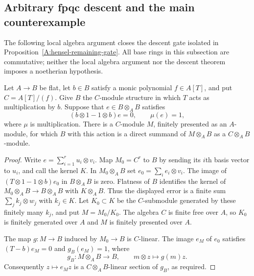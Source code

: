 \subsection{Arbitrary fpqc descent and the main counterexample}

The following local algebra argument closes the descent gate isolated
in Proposition~\ref{A:hensel-remaining-gate}.  All base rings in this
subsection are commutative; neither the local algebra argument nor the
descent theorem imposes a noetherian hypothesis.

\begin{lemma}
\label{A:fpqc-finite-module}
Let $A\to B$ be flat, let $b\in B$ satisfy a monic polynomial
$f\in A[T]$, and put $C=A[T]/(f)$.  Give $B$ the $C$-module
structure in which $T$ acts as multiplication by $b$.  Suppose that
$e\in B\otimes_A B$ satisfies
\[
 (b\otimes1-1\otimes b)e=0,\qquad \mu(e)=1,
\]
where $\mu$ is multiplication.  There is a $C$-module $M$, finitely
presented as an $A$-module, for which $B$ with this action is a direct
summand of $M\otimes_A B$ as a $C\otimes_A B$-module.
\end{lemma}
\begin{proof}
Write $e=\sum_{i=1}^r u_i\otimes v_i$.  Map $M_0=C^r$ to $B$
by sending its $i$th basis vector to $u_i$, and call the kernel $K$.
In $M_0\otimes_A B$ set $e_0=\sum_i e_i\otimes v_i$.
The image of $(T\otimes1-1\otimes b)e_0$ in $B\otimes_A B$
is zero.  Flatness of $B$ identifies the kernel of
$M_0\otimes_A B\to B\otimes_A B$ with $K\otimes_A B$.
Thus the displayed error is a finite sum $\sum_j k_j\otimes w_j$
with $k_j\in K$.  Let $K_0\subset K$ be the $C$-submodule
generated by these finitely many $k_j$, and put $M=M_0/K_0$.
The algebra $C$ is finite free over $A$, so $K_0$ is finitely
generated over $A$ and $M$ is finitely presented over $A$.

The map $g:M\to B$ induced by $M_0\to B$ is $C$-linear.
The image $e_M$ of $e_0$ satisfies $(T-b)e_M=0$ and
$g_B(e_M)=1$, where
\[
 g_B:M\otimes_A B\longrightarrow B,\qquad
       m\otimes z\longmapsto g(m)z.
\]
Consequently $z\mapsto e_Mz$ is a $C\otimes_A B$-linear
section of $g_B$, as required.
\end{proof}


